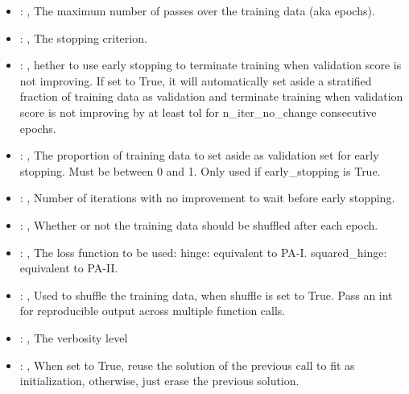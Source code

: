 \begin{itemize}
    \item {}: , 
      The maximum number of passes over the training data (aka epochs).

    \item {}: , 
      The stopping criterion.

    \item {}: , 
      hether to use early stopping to terminate training when validation score is not
      improving. If set to True, it will automatically set aside a stratified fraction of training
      data as validation and terminate training when validation score is not improving by at least
      tol for n\_iter\_no\_change consecutive epochs.

    \item {}: , 
      The proportion of training data to set aside as validation set for early stopping.
      Must be between 0 and 1. Only used if early\_stopping is True.

    \item {}: , 
      Number of iterations with no improvement to wait before early stopping.

    \item {}: , 
      Whether or not the training data should be shuffled after each epoch.

    \item {}: , 
      The loss function to be used: hinge: equivalent to PA-I.
      squared\_hinge: equivalent to PA-II.

    \item {}: , 
      Used to shuffle the training data, when shuffle is set to
      True. Pass an int for reproducible output across multiple function calls.

    \item {}: , 
      The verbosity level

    \item {}: , 
      When set to True, reuse the solution of the previous call
      to fit as initialization, otherwise, just erase the previous solution.
  \end{itemize}


